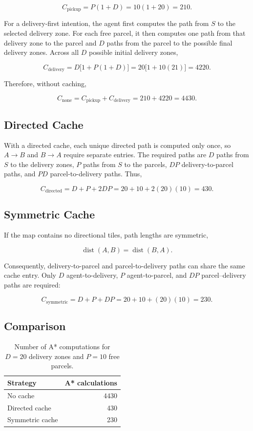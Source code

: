 \documentclass[a4paper]{article}
\begin{document}
\[
C_{\mathrm{pickup}} = P(1+D)
                     = 10(1+20)
                     = 210.
\]

For a delivery-first intention, the agent first computes the path from
$S$ to the selected delivery zone. For each free parcel, it then computes
one path from that delivery zone to the parcel and $D$ paths from the
parcel to the possible final delivery zones. Across all $D$ possible
initial delivery zones,

\[
C_{\mathrm{delivery}}
    = D\bigl[1+P(1+D)\bigr]
    = 20\bigl[1+10(21)\bigr]
    = 4220.
\]

Therefore, without caching,

\[
C_{\mathrm{none}}
    = C_{\mathrm{pickup}} + C_{\mathrm{delivery}}
    = 210 + 4220
    = \boxed{4430}.
\]

\subsection{Directed Cache}

With a directed cache, each unique directed path is computed only once,
so $A\rightarrow B$ and $B\rightarrow A$ require separate entries.
The required paths are $D$ paths from $S$ to the delivery zones, $P$
paths from $S$ to the parcels, $DP$ delivery-to-parcel paths, and $PD$
parcel-to-delivery paths. Thus,

\[
C_{\mathrm{directed}}
    = D + P + 2DP
    = 20 + 10 + 2(20)(10)
    = \boxed{430}.
\]

\subsection{Symmetric Cache}

If the map contains no directional tiles, path lengths are symmetric,

\[
\operatorname{dist}(A,B)=\operatorname{dist}(B,A).
\]

Consequently, delivery-to-parcel and parcel-to-delivery paths can share
the same cache entry. Only $D$ agent-to-delivery, $P$ agent-to-parcel,
and $DP$ parcel--delivery paths are required:

\[
C_{\mathrm{symmetric}}
    = D + P + DP
    = 20 + 10 + (20)(10)
    = \boxed{230}.
\]

\subsection{Comparison}

\begin{table}[t]
    \centering
    \begin{tabular}{lr}
        \toprule
        \textbf{Strategy} & \textbf{A* calculations} \\
        \midrule
        No cache        & 4430 \\
        Directed cache  & 430  \\
        Symmetric cache & 230  \\
        \bottomrule
    \end{tabular}
    \caption{Number of A* computations for $D=20$ delivery zones and
    $P=10$ free parcels.}
    \label{tab:pathfinding}
\end{table}
\end{document}
